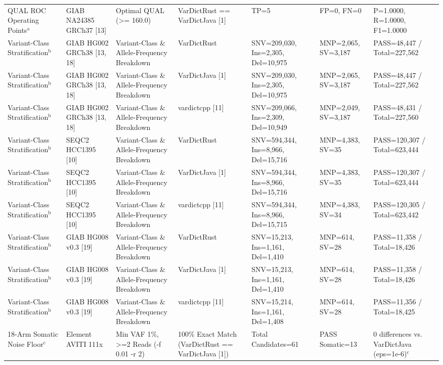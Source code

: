 \begin{table}[htbp]
{\begin{tabular}{lllllll}
QUAL ROC Operating Points$^{\text{a}}$ & GIAB NA24385 GRCh37 [13] & Optimal QUAL (\textgreater{}= 160.0) & VarDictRust == VarDictJava [1] & TP=5 & FP=0, FN=0 & P=1.0000, R=1.0000, F1=1.0000 \\
Variant-Class Stratification$^{\text{b}}$ & GIAB HG002 GRCh38 [13, 18] & Variant-Class \& Allele-Frequency Breakdown & VarDictRust & SNV=209,030, Ins=2,305, Del=10,975 & MNP=2,065, SV=3,187 & PASS=48,447 / Total=227,562 \\
Variant-Class Stratification$^{\text{b}}$ & GIAB HG002 GRCh38 [13, 18] & Variant-Class \& Allele-Frequency Breakdown & VarDictJava [1] & SNV=209,030, Ins=2,305, Del=10,975 & MNP=2,065, SV=3,187 & PASS=48,447 / Total=227,562 \\
Variant-Class Stratification$^{\text{b}}$ & GIAB HG002 GRCh38 [13, 18] & Variant-Class \& Allele-Frequency Breakdown & vardictcpp [11] & SNV=209,066, Ins=2,309, Del=10,949 & MNP=2,049, SV=3,187 & PASS=48,431 / Total=227,560 \\
Variant-Class Stratification$^{\text{b}}$ & SEQC2 HCC1395 [10] & Variant-Class \& Allele-Frequency Breakdown & VarDictRust & SNV=594,344, Ins=8,966, Del=15,716 & MNP=4,383, SV=35 & PASS=120,307 / Total=623,444 \\
Variant-Class Stratification$^{\text{b}}$ & SEQC2 HCC1395 [10] & Variant-Class \& Allele-Frequency Breakdown & VarDictJava [1] & SNV=594,344, Ins=8,966, Del=15,716 & MNP=4,383, SV=35 & PASS=120,307 / Total=623,444 \\
Variant-Class Stratification$^{\text{b}}$ & SEQC2 HCC1395 [10] & Variant-Class \& Allele-Frequency Breakdown & vardictcpp [11] & SNV=594,344, Ins=8,966, Del=15,715 & MNP=4,383, SV=34 & PASS=120,305 / Total=623,442 \\
Variant-Class Stratification$^{\text{b}}$ & GIAB HG008 v0.3 [19] & Variant-Class \& Allele-Frequency Breakdown & VarDictRust & SNV=15,213, Ins=1,161, Del=1,410 & MNP=614, SV=28 & PASS=11,358 / Total=18,426 \\
Variant-Class Stratification$^{\text{b}}$ & GIAB HG008 v0.3 [19] & Variant-Class \& Allele-Frequency Breakdown & VarDictJava [1] & SNV=15,213, Ins=1,161, Del=1,410 & MNP=614, SV=28 & PASS=11,358 / Total=18,426 \\
Variant-Class Stratification$^{\text{b}}$ & GIAB HG008 v0.3 [19] & Variant-Class \& Allele-Frequency Breakdown & vardictcpp [11] & SNV=15,214, Ins=1,161, Del=1,408 & MNP=614, SV=28 & PASS=11,356 / Total=18,425 \\
18-Arm Somatic Noise Floor$^{\text{c}}$ & Element AVITI 111x & Min VAF 1\%, \textgreater{}=2 Reads (-f 0.01 -r 2) & 100\% Exact Match (VarDictRust == VarDictJava [1]) & Total Candidates=61 & PASS Somatic=13 & 0 differences vs. VarDictJava (eps=1e-6)$^{\text{c}}$ \\

\end{tabular}}
\end{table}
